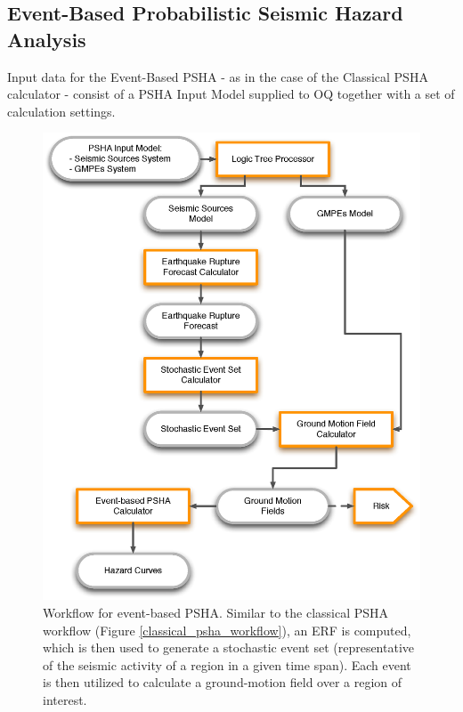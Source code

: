 \subsection{Event-Based Probabilistic Seismic Hazard Analysis}
\label{section:event-basedPSHA}
Input data for the Event-Based PSHA - as in the case of the Classical PSHA 
calculator - consist of a PSHA Input Model supplied to OQ together with a 
set of calculation settings.
%
\begin{figure}
\centering
\includegraphics[width=14cm]{./figures/event_based_workflow.eps}
\caption{Workflow for event-based PSHA. Similar to the classical PSHA workflow 
(Figure \ref{classical_psha_workflow}), an ERF is computed, which is then used 
to generate a stochastic event set (representative of the seismic activity of 
a region in a given time span). Each event is then utilized to calculate a 
ground-motion field over a region of interest.}
\label{event_based_workflow}
\end{figure}
